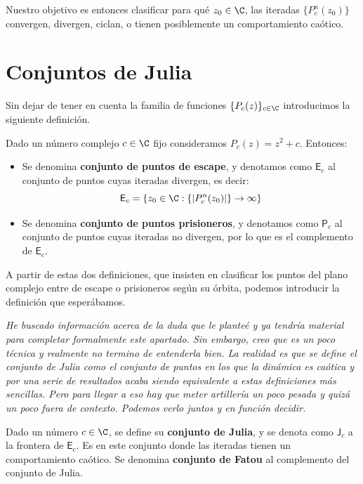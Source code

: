 Nuestro objetivo es entonces clasificar para qué $z_0\in\C$, las iteradas $\{P_c^n(z_0)\}$ convergen, divergen, ciclan, o tienen posiblemente un comportamiento caótico.

\section{Conjuntos de Julia}

Sin dejar de tener en cuenta la familia de funciones $\{P_c(z)\}_{c\in\C}$ introducimos la siguiente definición.

\begin{definicion}
  Dado un número complejo $c\in\C$ fijo consideramos $P_c(z)=z^2+c$. Entonces:
  \begin{itemize}
    \item Se denomina \textbf{conjunto de puntos de escape}, y denotamos como $\mathsf{E}_c$ al conjunto de puntos cuyas iteradas divergen, es decir:
    $$
    \mathsf{E}_c = \{z_0\in\C: \{|P_c^n(z_0)|\}\rightarrow \infty \}
    $$
    \item  Se denomina \textbf{conjunto de puntos prisioneros}, y denotamos como $\mathsf{P}_c$ al conjunto de puntos cuyas iteradas no divergen, por lo que es el complemento de $\mathsf{E}_c$.
  \end{itemize}
\end{definicion}

A partir de estas dos definiciones, que insisten en clasificar los puntos del plano complejo entre de escape o prisioneros según su órbita, podemos introducir la definición que esperábamos.

\textit{He buscado información acerca de la duda que le planteé y ya tendría material para completar formalmente este apartado. Sin embargo, creo que es un poco técnica y realmente no termino de entenderla bien. La realidad es que se define el conjunto de Julia como el conjunto de puntos en los que la dinámica es caótica y por una serie de resultados acaba siendo equivalente a estas definiciones más sencillas. Pero para llegar a eso hay que meter artillería un poco pesada y quizá un poco fuera de contexto. Podemos verlo juntos y en función decidir.}

\begin{definicion}
Dado un número $c\in\C$, se define su \textbf{conjunto de Julia}, y se denota como $\mathsf{J}_c$ a la frontera de $\mathsf{E}_c$. Es en este conjunto donde las iteradas tienen un comportamiento caótico. Se denomina \textbf{conjunto de Fatou} al complemento del conjunto de Julia.
\end{definicion}



